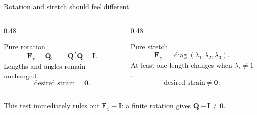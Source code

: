 \documentclass[aspectratio=169,11pt]{beamer}
\newcommand{\I}{\bm{I}}
\newcommand{\Fdef}{\bm{F}_{\chi}}
\begin{document}
\begin{frame}{Rotation and stretch should feel different}
\begin{columns}[T,onlytextwidth]
\begin{column}{0.48\textwidth}
\begin{block}{Pure rotation}
\[
  \Fdef=\bm{Q},
  \qquad
  \bm{Q}^T\bm{Q}=\I .
\]
Lengths and angles remain unchanged.
\[
  \text{desired strain}=\bm{0}.
\]
\end{block}
\end{column}
\begin{column}{0.48\textwidth}
\begin{block}{Pure stretch}
\[
  \Fdef=\operatorname{diag}
  (\lambda_1,\lambda_2,\lambda_3).
\]
At least one length changes when \(\lambda_i\ne1\).
\[
  \text{desired strain}\ne\bm{0}.
\]
\end{block}
\end{column}
\end{columns}
\medskip
\begin{punchbox}
\small
This test immediately rules out \(\Fdef-\I\): a finite rotation gives \(\bm{Q}-\I\ne\bm{0}\).
\end{punchbox}
\end{frame}
\end{document}

